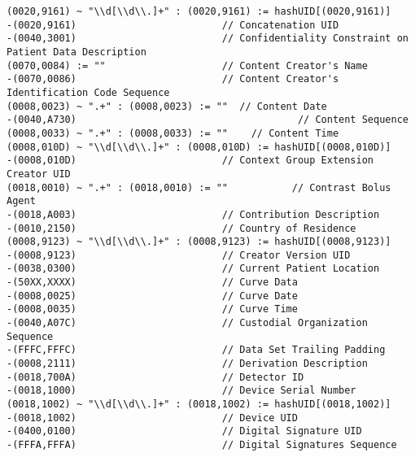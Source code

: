 \documentclass{beamer}  %
\begin{document}
\begin{frame}[fragile]
\tiny
\begin{verbatim}
(0020,9161) ~ "\\d[\\d\\.]+" : (0020,9161) := hashUID[(0020,9161)]
-(0020,9161)                         // Concatenation UID
-(0040,3001)                         // Confidentiality Constraint on Patient Data Description
(0070,0084) := ""                    // Content Creator's Name
-(0070,0086)                         // Content Creator's Identification Code Sequence
(0008,0023) ~ ".+" : (0008,0023) := ""  // Content Date
-(0040,A730)                                      // Content Sequence
(0008,0033) ~ ".+" : (0008,0033) := ""    // Content Time
(0008,010D) ~ "\\d[\\d\\.]+" : (0008,010D) := hashUID[(0008,010D)]
-(0008,010D)                         // Context Group Extension Creator UID
(0018,0010) ~ ".+" : (0018,0010) := ""           // Contrast Bolus Agent
-(0018,A003)                         // Contribution Description
-(0010,2150)                         // Country of Residence
(0008,9123) ~ "\\d[\\d\\.]+" : (0008,9123) := hashUID[(0008,9123)]
-(0008,9123)                         // Creator Version UID
-(0038,0300)                         // Current Patient Location
-(50XX,XXXX)                         // Curve Data
-(0008,0025)                         // Curve Date
-(0008,0035)                         // Curve Time
-(0040,A07C)                         // Custodial Organization Sequence
-(FFFC,FFFC)                         // Data Set Trailing Padding
-(0008,2111)                         // Derivation Description
-(0018,700A)                         // Detector ID
-(0018,1000)                         // Device Serial Number
(0018,1002) ~ "\\d[\\d\\.]+" : (0018,1002) := hashUID[(0018,1002)]
-(0018,1002)                         // Device UID
-(0400,0100)                         // Digital Signature UID
-(FFFA,FFFA)                         // Digital Signatures Sequence
\end{verbatim}
\end{frame}
\end{document}
